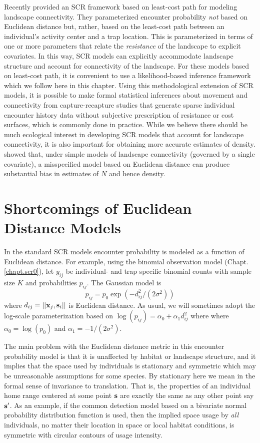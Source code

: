 Recently \citet{royle_etal:2012ecol} provided an SCR 
framework based on least-cost path for modeling landscape
connectivity. They parameterized encounter 
probability {\it not} based on Euclidean distance but, rather, based
on the least-cost path between an individual's activity center and a
trap location. This is parameterized in terms of one or more
parameters that relate the {\it resistance} of the landscape to
explicit covariates.  In this way, SCR models can explicitly accommodate
landscape structure and account for connectivity of the landscape.
For these models based on least-cost path, it is convenient to use a
likelihood-based inference framework which we follow here in this
chapter. 
Using this
methodological extension of SCR models, it is possible to make formal
statistical inferences about movement and connectivity from
capture-recapture studies that generate sparse individual encounter
history data without subjective prescription of resistance or cost
surfaces, which is commonly done in practice.  While we believe there
should be much ecological interest in developing SCR models that
account for landscape connectivity, it is also important for obtaining
more accurate estimates of density.  \citet{royle_etal:2012ecol}
showed that, under simple models of landscape connectivity (governed
by a single covariate), a misspecified model based on Euclidean
distance can produce substantial bias in estimates of $N$ and hence
density.

\section{Shortcomings of Euclidean Distance Models}

In the standard SCR models encounter probability is modeled as a
function of Euclidean distance. For example, using the binomial
observation model (Chapt. \ref{chapt.scr0}), let $y_{ij}$ be
individual- and trap specific binomial counts with sample size $K$ and
probabilities $p_{ij}$. The Gaussian model is
\[
p_{ij} = p_{0} \exp(-  d_{ij}^2 /(2\sigma^{2}) )
\]
where $d_{ij} = ||{\bf x}_{j}, {\bf s}_{i}||$ is Euclidean
distance. As usual, we will sometimes adopt the log-scale
parameterization based on $\log(p_{ij})= \alpha_{0} + \alpha_{1}
d_{ij}^{2}$ where where $\alpha_{0} = \log(p_{0})$ and $\alpha_{1} =
-1/(2\sigma^2)$.

The main problem with the Euclidean distance metric in this encounter
probability model is that it is unaffected by habitat or landscape
structure, and it implies that the space used by individuals is
stationary and symmetric which may be unreasonable assumptions for
some species. By stationary here we mean in the formal sense of
invariance to translation. That is, the properties of an individual
home range centered at some point ${\bf s}$ are exactly the same as
any other point say ${\bf s}'$.  As an example, if the common
detection model based on a bivariate normal probability distribution
function is used, then the implied space usage by {\it all}
individuals, no matter their location in space or local habitat
conditions, is symmetric with circular contours of usage intensity.

